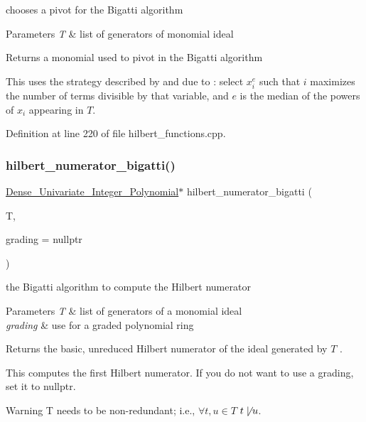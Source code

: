 chooses a pivot for the Bigatti algorithm 


\begin{DoxyParams}{Parameters}
{\em T} & list of generators of monomial ideal \\
\hline
\end{DoxyParams}
\begin{DoxyReturn}{Returns}
a monomial used to pivot in the Bigatti algorithm \cite{Bigatti97}
\end{DoxyReturn}
This uses the strategy described by \cite{RouneHilbert2010} and due to \cite{Bigatti97} \+: select $x_i^e$ such that $i$ maximizes the number of terms divisible by that variable, and $e$ is the median of the powers of $x_i$ appearing in $T$. 

Definition at line 220 of file hilbert\+\_\+functions.\+cpp.

\mbox{\label{group__commalg_ga7ea0076f04ca9380641ff2af7c9a6e42}} 
\subsubsection{\texorpdfstring{hilbert\+\_\+numerator\+\_\+bigatti()}{hilbert\_numerator\_bigatti()}}
{\footnotesize\ttfamily \hyperlink{group__polygroup_class_dense___univariate___integer___polynomial}{Dense\+\_\+\+Univariate\+\_\+\+Integer\+\_\+\+Polynomial}$\ast$ hilbert\+\_\+numerator\+\_\+bigatti (\begin{DoxyParamCaption}\item[{const list$<$ \hyperlink{group__polygroup_class_monomial}{Monomial} $>$ \&}]{T,  }\item[{const W\+T\+\_\+\+T\+Y\+PE $\ast$}]{grading = {\ttfamily nullptr} }\end{DoxyParamCaption})}



the Bigatti algorithm to compute the Hilbert numerator \cite{Bigatti97} 


\begin{DoxyParams}{Parameters}
{\em T} & list of generators of a monomial ideal \\
\hline
{\em grading} & use for a graded polynomial ring \\
\hline
\end{DoxyParams}
\begin{DoxyReturn}{Returns}
the basic, unreduced Hilbert numerator of the ideal generated by $ T $ .
\end{DoxyReturn}
This computes the first Hilbert numerator. If you do not want to use a grading, set it to {\ttfamily nullptr}. \begin{DoxyWarning}{Warning}
{\ttfamily T} needs to be non-\/redundant; i.\+e., $\forall t,u\in T$ $t\not\mid u$. 
\end{DoxyWarning}


